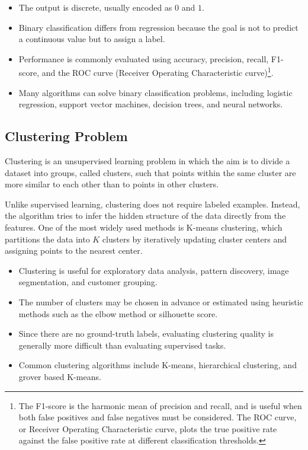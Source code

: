 \documentclass[english,12pt,a4paper]{report}
\begin{document}
	
	\begin{itemize}
		\item The output is discrete, usually encoded as $0$ and $1$.
		\item Binary classification differs from regression because the goal is not to predict a continuous value but to assign a label.
		\item Performance is commonly evaluated using accuracy, precision, recall, F1-score, and the ROC  curve (Receiver Operating Characteristic curve)\footnote{The F1-score is the harmonic mean of precision and recall, and is useful when both false positives and false negatives must be considered. The ROC curve, or Receiver Operating Characteristic curve, plots the true positive rate against the false positive rate at different classification thresholds.}.
		\item Many algorithms can solve binary classification problems, including logistic regression, support vector machines, decision trees, and neural networks.
	\end{itemize}
	
	
	\subsection{Clustering Problem}
	\hspace{1.15em}Clustering is an unsupervised learning problem in which the aim is to divide a dataset into groups, called clusters, such that points within the same cluster are more similar to each other than to points in other clusters.
	
	Unlike supervised learning, clustering does not require labeled examples. Instead, the algorithm tries to infer the hidden structure of the data directly from the features. One of the most widely used methods is K-means clustering, which partitions the data into $K$ clusters by iteratively updating cluster centers and assigning points to the nearest center.
	
	\begin{itemize}
		\item Clustering is useful for exploratory data analysis, pattern discovery, image segmentation, and customer grouping.
		\item The number of clusters may be chosen in advance or estimated using heuristic methods such as the elbow method or silhouette score.
		\item Since there are no ground-truth labels, evaluating clustering quality is generally more difficult than evaluating supervised tasks.
		\item Common clustering algorithms include K-means, hierarchical clustering, and grover based K-means.
	\end{itemize}
	
\end{document}
